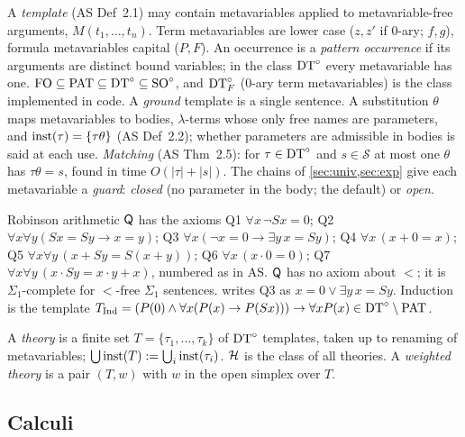 A \emph{template} (AS Def~2.1) may contain metavariables applied to metavariable-free arguments, $M(t_1,\dots,t_n)$. Term metavariables are lower case ($z,z'$ if $0$-ary; $f,g$), formula metavariables capital ($P,F$). An occurrence is a \emph{pattern occurrence} if its arguments are distinct bound variables; in the class $\mathrm{DT}^{\circ}$ every metavariable has one. $\mathrm{FO}\subseteq\mathrm{PAT}\subseteq\mathrm{DT}^{\circ}\subseteq\mathrm{SO}^{\circ}$, and $\mathrm{DT}^{\circ}_{F}$ ($0$-ary term metavariables) is the class implemented in code. A \emph{ground} template is a single sentence. A substitution $\theta$ maps metavariables to bodies, $\lambda$-terms whose only free names are parameters, and $\mathrm{inst}(\tau)=\{\tau\theta\}$ (AS Def~2.2); whether parameters are admissible in bodies is said at each use. \emph{Matching} (AS Thm~2.5): for $\tau\in\mathrm{DT}^{\circ}$ and $s\in\mathcal S$ at most one $\theta$ has $\tau\theta=s$, found in time $O(|\tau|+|s|)$. The chains of \cref{sec:univ,sec:exp} give each metavariable a \emph{guard}: \emph{closed} (no parameter in the body; the default) or \emph{open}.

Robinson arithmetic $\mathsf{Q}$ has the axioms Q1 $\forall x\,\neg Sx=0$; Q2 $\forall x\forall y(Sx=Sy\to x=y)$; Q3 $\forall x(\neg x=0\to\exists y\,x=Sy)$; Q4 $\forall x\,(x+0=x)$; Q5 $\forall x\forall y\,(x+Sy=S(x+y))$; Q6 $\forall x\,(x\cdot 0=0)$; Q7 $\forall x\forall y\,(x\cdot Sy=x\cdot y+x)$, numbered as in AS. $\mathsf{Q}$ has no axiom about $<$; it is $\Sigma_1$-complete for $<$-free $\Sigma_1$ sentences.  writes Q3 as $x=0\vee\exists y\,x=Sy$. Induction is the template $T_{\mathrm{Ind}}=(P(0)\wedge\forall x(P(x)\to P(Sx)))\to\forall xP(x)\in\mathrm{DT}^{\circ}\setminus\mathrm{PAT}$.

\begin{definition}[Theories]\label{def:model:theory}
A \emph{theory} is a finite set $T=\{\tau_1,\dots,\tau_k\}$ of $\mathrm{DT}^{\circ}$ templates, taken up to renaming of metavariables; $\bigcup\mathrm{inst}(T):=\bigcup_i\mathrm{inst}(\tau_i)$. $\mathcal{H}$ is the class of all theories. A \emph{weighted theory} is a pair $(T,w)$ with $w$ in the open simplex over $T$.
\end{definition}

\subsection{Calculi}\label{sec:model:calculi}

